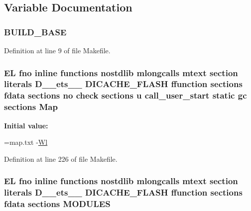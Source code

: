 \subsection{Variable Documentation}
\hypertarget{Makefile_aaa9bbf75d7f8fc94a5c7dd9504b7a178}{
\subsubsection[{B\-U\-I\-L\-D\-\_\-\-B\-A\-S\-E}]{\setlength{\rightskip}{0pt plus 5cm}B\-U\-I\-L\-D\-\_\-\-B\-A\-S\-E}}\label{Makefile_aaa9bbf75d7f8fc94a5c7dd9504b7a178}


Definition at line 9 of file Makefile.

\hypertarget{Makefile_a3d2682475b097eef42d87fa20f765794}{
\subsubsection[{Map}]{\setlength{\rightskip}{0pt plus 5cm}E\-L fno inline functions nostdlib mlongcalls mtext section literals D\-\_\-\-\_\-ets\-\_\-\-\_\- D\-I\-C\-A\-C\-H\-E\-\_\-\-F\-L\-A\-S\-H ffunction sections fdata sections no check sections u call\-\_\-user\-\_\-start static gc sections Map\hspace{0.3cm}{\ttfamily [static]}}}\label{Makefile_a3d2682475b097eef42d87fa20f765794}
{\bfseries Initial value\-:}
\begin{DoxyCode}
=map.txt  
-\hyperlink{Makefile_a1af3a6ecef406b93f1a1db145b2cfd43}{Wl}
\end{DoxyCode}


Definition at line 226 of file Makefile.

\hypertarget{Makefile_a61c8d9ae20beeb28ac4075403cc4ea41}{
\subsubsection[{M\-O\-D\-U\-L\-E\-S}]{\setlength{\rightskip}{0pt plus 5cm}E\-L fno inline functions nostdlib mlongcalls mtext section literals D\-\_\-\-\_\-ets\-\_\-\-\_\- D\-I\-C\-A\-C\-H\-E\-\_\-\-F\-L\-A\-S\-H ffunction sections fdata sections M\-O\-D\-U\-L\-E\-S}}\label{Makefile_a61c8d9ae20beeb28ac4075403cc4ea41}


